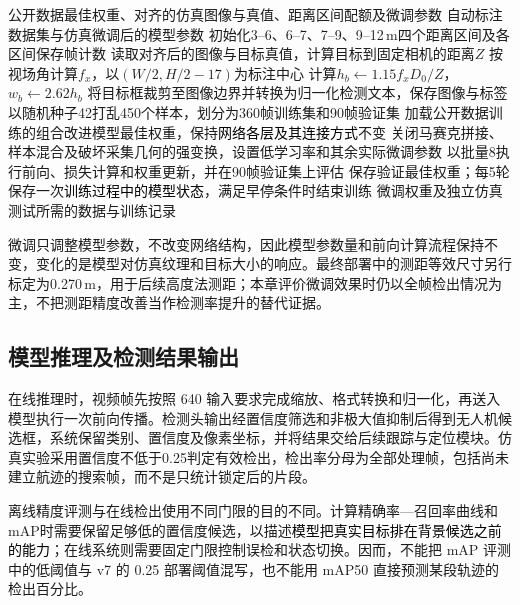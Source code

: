 \begin{algorithm}[htbp]
\caption{仿真样本自动标注与适度微调}
\label{alg:ch5-finetune}
\small
\begin{algorithmic}[1]
\REQUIRE 公开数据最佳权重、对齐的仿真图像与真值、距离区间配额及微调参数
\ENSURE 自动标注数据集与仿真微调后的模型参数
\STATE 初始化3--6、6--7、7--9、9--12\,m四个距离区间及各区间保存帧计数
  \STATE 读取对齐后的图像与目标真值，计算目标到固定相机的距离$Z$
    \STATE 按视场角计算$f_x$，以$(W/2,H/2-17)$为标注中心
    \STATE 计算$h_b\gets1.15f_xD_0/Z$，$w_b\gets2.62h_b$
    \STATE 将目标框裁剪至图像边界并转换为归一化检测文本，保存图像与标签
  \ENDIF
\ENDWHILE
\STATE 以随机种子42打乱450个样本，划分为360帧训练集和90帧验证集
\STATE 加载公开数据训练的组合改进模型最佳权重，保持\textcolor{black}{网络各层及其连接方式}不变
\STATE 关闭马赛克拼接、样本混合及破坏采集几何的强变换，设置低学习率和其余实际微调参数
  \STATE 以批量8执行前向、损失计算和权重更新，并在90帧验证集上评估
  \STATE 保存验证最佳权重；每5轮保存一次\textcolor{black}{训练过程中的模型状态}，满足早停条件时结束训练
\ENDFOR
\RETURN 微调权重及独立仿真测试所需的数据与训练记录
\end{algorithmic}
\end{algorithm}

微调只调整模型参数，不改变网络结构，因此模型参数量和前向计算流程保持不变，变化的是模型对仿真纹理和目标大小的响应。最终部署中的测距等效尺寸另行标定为0.270\,m，用于后续高度法测距；本章评价微调效果时仍以全帧检出情况为主，不把测距精度改善当作检测率提升的替代证据。

\subsection{模型推理及检测结果输出}
\label{subsec:ch5_inference}

在线推理时，视频帧先按照 640 输入要求完成缩放、格式转换和归一化，再送入模型执行一次前向传播。检测头输出经置信度筛选和非极大值抑制后得到无人机候选框，系统保留类别、置信度及像素坐标，并将结果交给后续跟踪与定位模块。仿真实验采用置信度不低于0.25判定有效检出，检出率分母为全部处理帧，包括尚未建立航迹的搜索帧，而不是只统计锁定后的片段。

离线精度评测与在线检出使用不同门限的目的不同。计算精确率—召回率曲线和mAP时需要保留足够低的置信度候选，以描述\textcolor{black}{模型把真实目标排在背景候选之前的能力}；在线系统则需要固定门限控制误检和状态切换。因而，不能把 mAP 评测中的低阈值与 v7 的 0.25 部署阈值混写，也不能用 mAP50 直接预测某段轨迹的检出百分比。

